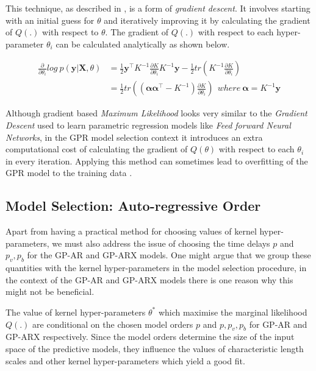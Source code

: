 \documentclass{article}
\begin{document}
This technique, as described in \citet{Rasmussen:2005:GPM:1162254}, is a form of \emph{gradient descent}. It involves starting with an initial guess for $\theta$ and iteratively improving it by calculating the gradient of $Q(.)$ with respect to $\theta$. The gradient of $Q(.)$ with respect to each hyper-parameter $\theta_i$ can be calculated analytically as shown below.

\begin{align*}
\frac{\partial}{\partial \theta_i} log \ p(\mathbf{y}|\mathbf{X}, \theta) & = \frac{1}{2} \mathbf{y}^\intercal K^{-1} \frac{\partial K}{\partial \theta_i} K^{-1} \mathbf{y}  - \frac{1}{2} tr(K^{-1} \frac{\partial K}{\partial \theta_i})\\
 & = \frac{1}{2} tr((\mathbf{\alpha}\mathbf{\alpha}^\intercal - K^{-1}) \frac{\partial K}{\partial \theta_i}) \ \ where \ \mathbf{\alpha} = K^{-1} \mathbf{y}
\end{align*}


Although gradient based \emph{Maximum Likelihood} looks very similar to the \emph{Gradient Descent} used to learn parametric regression models like \emph{Feed forward Neural Networks}, in the GPR model selection context it introduces an extra computational cost of calculating the gradient of $Q(\theta)$ with respect to each $\theta_i$ in every iteration. Applying this method can sometimes lead to overfitting of the GPR model to the training data \citep{Rasmussen:2005:GPM:1162254}.

\subsection{Model Selection: Auto-regressive Order}

Apart from having a practical method for choosing values of kernel hyper-parameters, we must also address the issue of choosing the time delays $p$ and $p_v, p_b$ for the GP-AR and GP-ARX models. One might argue that we group these quantities with the kernel hyper-parameters in the model selection procedure, in the context of the GP-AR and GP-ARX models there is one reason why this might not be beneficial. 

The value of kernel hyper-parameters $\theta^*$ which maximise the marginal likelihood $Q(.)$ are conditional on the chosen model orders $p$ and $p, p_v, p_b$ for GP-AR and GP-ARX respectively. Since the model orders determine the size of the input space of the predictive models, they influence the values of characteristic length scales and other kernel hyper-parameters which yield a good fit.
\end{document}
